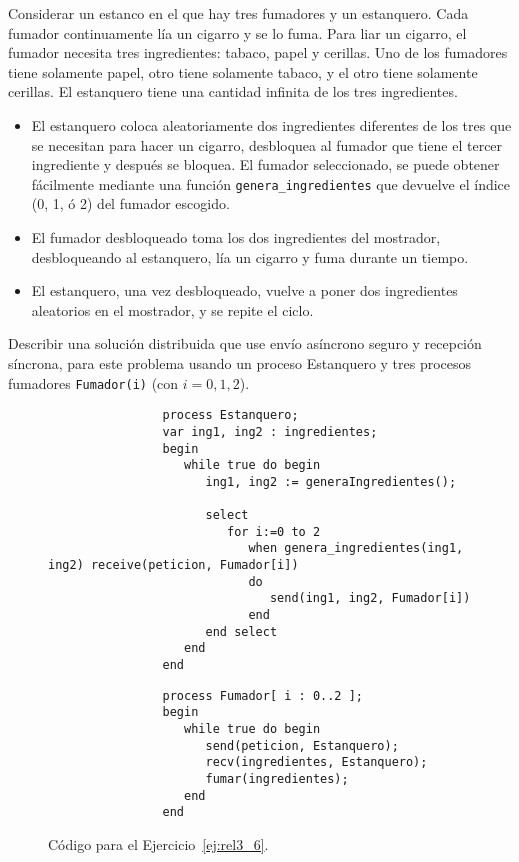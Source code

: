 \begin{ejercicio}\label{ej:rel3_6}
    Considerar un estanco en el que hay tres fumadores y un estanquero. Cada fumador continuamente lía un cigarro y se lo fuma. Para liar un cigarro, el fumador necesita tres ingredientes: tabaco, papel y cerillas. Uno de los fumadores tiene solamente papel, otro tiene solamente tabaco, y el otro tiene solamente cerillas. El estanquero tiene una cantidad infinita de los tres ingredientes.
    \begin{itemize}
        \item El estanquero coloca aleatoriamente dos ingredientes diferentes de los tres que se necesitan para hacer un cigarro, desbloquea al fumador que tiene el tercer ingrediente y después se bloquea. El fumador seleccionado, se puede obtener fácilmente mediante una función \verb|genera_ingredientes| que devuelve el índice (0, 1, ó 2) del fumador escogido.
        \item El fumador desbloqueado toma los dos ingredientes del mostrador, desbloqueando al estanquero, lía un cigarro y fuma durante un tiempo.
        \item El estanquero, una vez desbloqueado, vuelve a poner dos ingredientes aleatorios en el mostrador, y se repite el ciclo.
    \end{itemize}
    Describir una solución distribuida que use envío asíncrono seguro y recepción síncrona, para este problema usando un proceso Estanquero y tres procesos fumadores \verb|Fumador(i)| (con $i=0, 1, 2$).

    \begin{figure}[H]
        \centering
            \begin{verbatim}
                process Estanquero;
                var ing1, ing2 : ingredientes;
                begin
                   while true do begin
                      ing1, ing2 := generaIngredientes();

                      select
                         for i:=0 to 2
                            when genera_ingredientes(ing1, ing2) receive(peticion, Fumador[i])
                            do
                               send(ing1, ing2, Fumador[i])
                            end
                      end select
                   end
                end
            \end{verbatim}
            \begin{verbatim}
                process Fumador[ i : 0..2 ];
                begin
                   while true do begin
                      send(peticion, Estanquero);
                      recv(ingredientes, Estanquero);
                      fumar(ingredientes);
                   end
                end
            \end{verbatim}
        \caption{Código para el Ejercicio~\ref{ej:rel3_6}.}
        \label{fig:cod_6}
    \end{figure}
\end{ejercicio}

